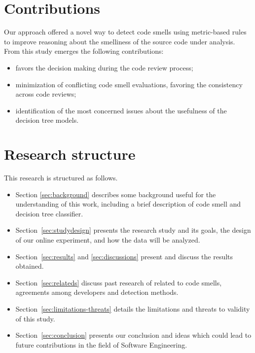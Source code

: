 \section{Contributions}
 
Our approach offered a novel way to detect code smells using metric-based rules to improve reasoning about the smelliness of the source code under analysis.
From this study emerges the following contributions:
     \begin{itemize}
         \item favors the decision making during the code review process;
         \item minimization of conflicting code smell evaluations, favoring the consistency across code reviews;
         \item identification of the most concerned issues about the usefulness of the decision tree models.
     \end{itemize}

\section{Research structure}

This research is structured as follows. 
\begin{itemize}
    \item Section \ref{sec:background} describes some background useful for the understanding of this work, including a brief description of code smell and decision tree classifier.
    
    \item Section~\ref{sec:studydesign} presents the research study and its goals, the design of our online experiment, and how the data will be analyzed.
    
    \item Section~\ref{sec:results} and \ref{sec:discussions} present and discuss the results obtained.
    
    
    \item Section~\ref{sec:relateds} discuss past research of related to code smells, agreements among developers and detection methods. 
    
    \item Section~\ref{sec:limitations-threats} details the limitations and threats to validity of this study.
    
    \item Section~\ref{sec:conclusion} presents our conclusion and ideas which could lead to future contributions in the field of Software Engineering.
\end{itemize}